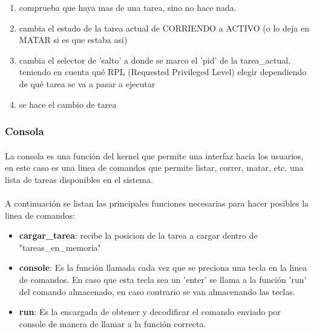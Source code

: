 \documentclass[11pt, a4paper]{article}
\begin{document}
			\begin{enumerate}
				\item comprueba que haya mas de una tarea, sino no hace nada.
				\item cambia el estado de la tarea actual de CORRIENDO a ACTIVO (o lo deja en MATAR si es que estaba asi)
				\item cambia el selector de 'salto' a donde se marco el 'pid' de la tarea\_actual, teniendo en cuenta qué RPL (Requested Privileged Level) elegir dependiendo de qué tarea se va a pasar a ejecutar
				\item se hace el cambio de tarea
			\end{enumerate}

		\subsubsection{Consola}
			\paragraph{}
				La consola es una función del kernel que permite una interfaz hacia los usuarios, en este caso es una linea de comandos que permite listar, correr, matar, etc. una lista de tareas disponibles en el sistema. 
			\paragraph{}
				A continuación se listan las principales funciones necesarias para hacer posibles la linea de comandos:
				\begin{itemize}

                    \item \textbf{ cargar\_tarea}: recibe la posicion de la tarea a cargar dentro de "tareas\_en\_memoria"

                    \item \textbf{console}: Es la función llamada cada vez que se preciona una tecla en la linea de comandos. En caso que esta tecla sea un 'enter' se llama a la función 'run' del comando almacenado, en caso contrario se van almacenando las teclas.
                    \item \textbf{run}: Es la encargada de obtener y decodificar el comando enviado por console de manera de llamar a la función correcta.
			
				
				
				\end{itemize}				
	
\end{document}
